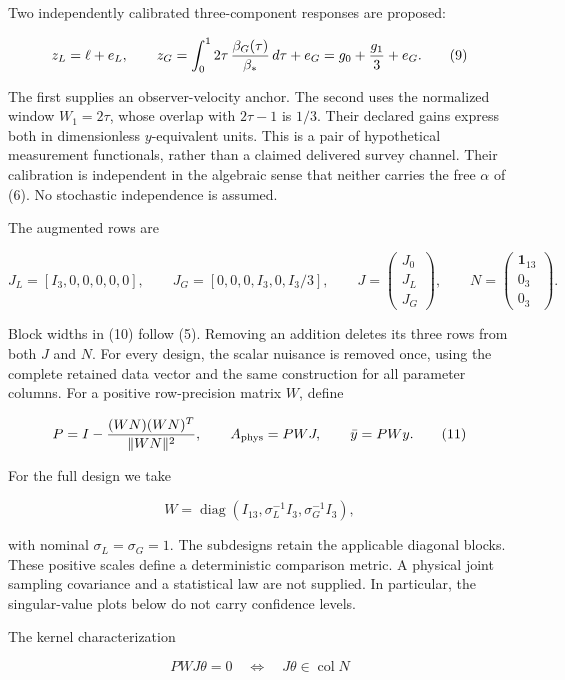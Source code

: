 Two independently calibrated three-component responses are proposed:

\[
z_L=\ell+e_L,\qquad
z_G=\int_0^1 2\tau\,{\beta_G(\tau)\over\beta_*}\,d\tau+e_G
     =g_0+{g_1\over3}+e_G.                              \tag{9}
\]

The first supplies an observer-velocity anchor. The second uses the normalized window \(W_1=2\tau\), whose overlap with \(2\tau-1\) is \(1/3\). Their declared gains express both in dimensionless \(y\)-equivalent units. This is a pair of hypothetical measurement functionals, rather than a claimed delivered survey channel. Their calibration is independent in the algebraic sense that neither carries the free \(\alpha\) of (6). No stochastic independence is assumed.

The augmented rows are

\[
J_L=[I_3,0,0,0,0,0],\qquad
J_G=[0,0,0,I_3,0,I_3/3],\qquad
J=\begin{pmatrix}J_0\\J_L\\J_G\end{pmatrix},\qquad
N=\begin{pmatrix}\mathbf1_{13}\\0_3\\0_3\end{pmatrix}.       \tag{10}
\]

Block widths in (10) follow (5). Removing an addition deletes its three rows from both \(J\) and \(N\). For every design, the scalar nuisance is removed once, using the complete retained data vector and the same construction for all parameter columns. For a positive row-precision matrix \(W\), define

\[
P=I-{(WN)(WN)^T\over\|WN\|^2},\qquad
A_{\rm phys}=PWJ,\qquad \bar y=PWy.                     \tag{11}
\]

For the full design we take

\[
W=\operatorname{diag}(I_{13},\sigma_L^{-1}I_3,
                                    \sigma_G^{-1}I_3),    \tag{12}
\]

with nominal \(\sigma_L=\sigma_G=1\). The subdesigns retain the applicable diagonal blocks. These positive scales define a deterministic comparison metric. A physical joint sampling covariance and a statistical law are not supplied. In particular, the singular-value plots below do not carry confidence levels.

The kernel characterization

\[
PWJ\theta=0\quad\Longleftrightarrow\quad J\theta\in\operatorname{col}N
                                                               \tag{13}
\]

